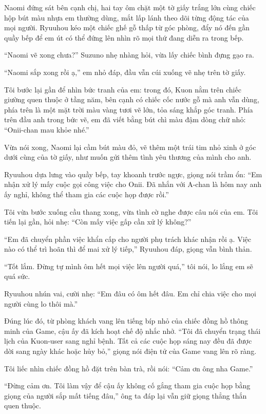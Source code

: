 \documentclass[../main.tex]{subfiles}
\begin{document}
Naomi đứng sát bên cạnh chị, hai tay ôm chặt một tờ giấy trắng lớn cùng chiếc hộp bút màu nhựa em thường dùng, mắt lấp lánh theo dõi từng động tác của mọi người. Ryuuhou kéo một chiếc ghế gỗ thấp từ góc phòng, đẩy nó đến gần quầy bếp để em út có thể đứng lên nhìn rõ mọi thứ đang diễn ra trong bếp.

``Naomi vẽ xong chưa?'' Suzuno nhẹ nhàng hỏi, vừa lấy chiếc bình đựng gạo ra.

``Naomi sắp xong rồi ạ,'' em nhỏ đáp, đầu vẫn cúi xuống vẽ nhẹ trên tờ giấy.

Tôi bước lại gần để nhìn bức tranh của em: trong đó, Kuon nằm trên chiếc giường quen thuộc ở tầng năm, bên cạnh có chiếc cốc nước gỗ mà anh vẫn dùng, phía trên là một mặt trời màu vàng tươi vẽ lớn, tỏa sáng khắp góc tranh. Phía trên đầu anh trong bức vẽ, em đã viết bằng bút chì màu đậm dòng chữ nhỏ: ``Onii-chan mau khỏe nhé.''

Vừa nói xong, Naomi lại cầm bút màu đỏ, vẽ thêm một trái tim nhỏ xinh ở góc dưới cùng của tờ giấy, như muốn gửi thêm tình yêu thương của mình cho anh.

Ryuuhou dựa lưng vào quầy bếp, tay khoanh trước ngực, giọng nói trầm ổn: ``Em nhận xử lý mấy cuộc gọi công việc cho Onii. Đã nhắn với A-chan là hôm nay anh ấy nghỉ, không thể tham gia các cuộc họp được rồi.''

Tôi vừa bước xuống cầu thang xong, vừa tình cờ nghe được câu nói của em. Tôi tiến lại gần, hỏi nhẹ: ``Còn mấy việc gấp cần xử lý không?''

``Em đã chuyển phần việc khẩn cấp cho người phụ trách khác nhận rồi ạ. Việc nào có thể trì hoãn thì để mai xử lý tiếp,'' Ryuuhou đáp, giọng vẫn bình thản.

``Tốt lắm. Đừng tự mình ôm hết mọi việc lên người quá,'' tôi nói, lo lắng em sẽ quá sức.

Ryuuhou nhún vai, cười nhẹ: ``Em đâu có ôm hết đâu. Em chỉ chia việc cho mọi người cùng lo thôi mà.''

Đúng lúc đó, từ phòng khách vang lên tiếng bíp nhỏ của chiếc đồng hồ thông minh của Game, cậu ấy đã kích hoạt chế độ nhắc nhở. ``Tôi đã chuyển trạng thái lịch của Kuon-user sang nghỉ bệnh. Tất cả các cuộc họp sáng nay đều đã được dời sang ngày khác hoặc hủy bỏ,'' giọng nói điện tử của Game vang lên rõ ràng.

Tôi liếc nhìn chiếc đồng hồ đặt trên bàn trà, rồi nói: ``Cảm ơn ông nha Game.''

``Đừng cảm ơn. Tôi làm vậy để cậu ấy không cố gắng tham gia cuộc họp bằng giọng của người sắp mất tiếng đâu,'' ông ta đáp lại vẫn giữ giọng thẳng thắn quen thuộc.
\end{document}
